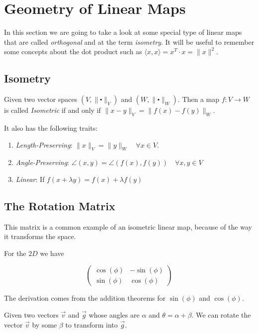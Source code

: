 \newpage
\section{Geometry of Linear Maps}

In this section we are going to take a look at some special type of linear maps that are called \emph{orthogonal} 
and at the term \emph{isometry}. It will be useful to remember some concepts about the dot product such as 
\(\langle x, x \rangle = x^T \cdot x = \|x\|^2\).

\subsection{Isometry}

Given two vector spaces \((V, \|\centerdot\|_V)\) and \((W, \|\centerdot\|_W)\). Then a map 
\(f: V \to W\) is called \emph{Isometric} if and only if \(\|x - y\|_V = \|f(x) - f(y)\|_W \).

It also has the following traits:

\begin{enumerate}
	\item \emph{Length-Preserving}: \(\|x\|_V = \|y\|_W \quad \forall x \in V\).
	\item \emph{Angle-Preserving}: \(\angle (x,y) = \angle (f(x),f(y)) \quad \forall x,y \in V\)
	\item \emph{Linear}: If \(f(x + \lambda y) = f(x) + \lambda f(y)\)
\end{enumerate}

\subsection{The Rotation Matrix}

This matrix is a common example of an isometric linear map, because of the way it transforms the space.

For the \(2D\) we have 

\[
    \begin{pmatrix}
        \cos(\phi) & -\sin(\phi)\\
        \sin(\phi) & \cos(\phi)
    \end{pmatrix}
\]

The derivation comes from the addition theorems for \(\sin(\phi) \) and \(\cos(\phi)\).

Given two vectors \(\vec{v}\) and \(\vec{g}\) whose angles are \(\alpha\) and \(\theta = \alpha + \beta\). 
We can rotate the vector \(\vec{v}\) by some \(\beta\) to transform into \(\vec{g}\).

